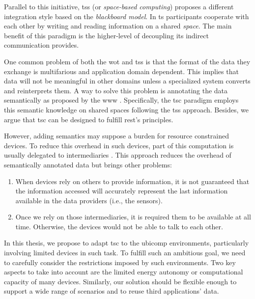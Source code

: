 
Parallel to this initiative, \aclp{ts} (or \emph{space-based computing}) \citep{gelernter_generative_1985} proposes a different integration style based on the \emph{blackboard model}.
In \ac{ts} participants cooperate with each other by writing and reading information on a shared \emph{space}.
The main benefit of this paradigm is the higher-level of decoupling its indirect communication provides. %


\bigskip

One common problem of both the \ac{wot} and \aclp{ts} is that the format of the data they exchange is multifarious and application domain dependent.
This implies that data will not be meaningful in other domains unless a specialized system converts and reinterprets them.
A way to solve this problem is annotating the data semantically as proposed by the \ac{www} \citep{berners-lee_semantic_2001}.
Specifically, the \ac{tsc} paradigm \citep{fensel_triple-space_2004} employs this semantic knowledge on shared spaces following the \aclp{ts} approach.
Besides, we argue that \ac{tsc} can be designed to fulfill \ac{rest}'s principles.


However, adding semantics may suppose a burden for resource constrained devices.
To reduce this overhead in such devices, part of this computation is usually delegated to intermediaries \citep{honkola_smart-m3_2010}. %
This approach reduces the overhead of semantically annotated data but brings other problems:
\begin{enumerate}
 \item When devices rely on others to provide information, it is not guaranteed that the information accessed will accurately represent the last information available in the data providers (i.e., the sensors).
 \item Once we rely on those intermediaries, it is required them to be available at all time.
	Otherwise, the devices would not be able to talk to each other.
\end{enumerate}


\bigskip


In this thesis, we propose to adapt \ac{tsc} to the \ac{ubicomp} environments, particularly involving limited devices in such task.
To fulfill such an ambitious goal, we need to carefully consider the restrictions imposed by such environments.
Two key aspects to take into account are the limited energy autonomy or computational capacity of many devices.
Similarly, our solution should be flexible enough to support a wide range of scenarios and to reuse third applications' data.


